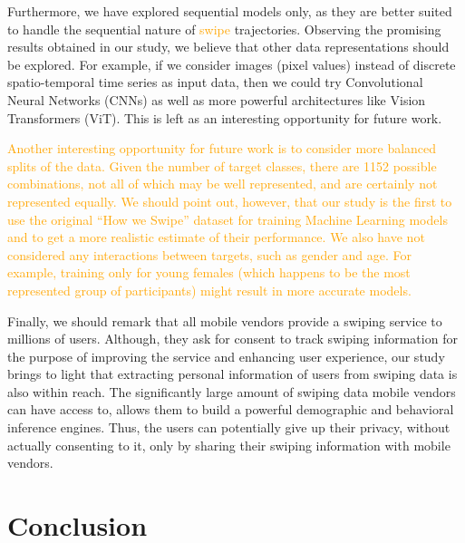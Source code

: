 \documentclass[sn-mathphys, pdflatex]{sn-jnl}
\newcommand{\rev}[1]{\textcolor{orange}{#1}}
\begin{document}
Furthermore, we have explored sequential models only,
as they are better suited to handle the sequential nature of \rev{swipe} trajectories.
Observing the promising results obtained in our study, we believe that other data representations should be explored.
For example, if we consider images (pixel values) instead of discrete spatio-temporal time series as input data,
then we could try Convolutional Neural Networks (CNNs) as well as more powerful architectures like Vision Transformers (ViT).
This is left as an interesting opportunity for future work.

\rev{
Another interesting opportunity for future work is to consider more balanced splits of the data.
Given the number of target classes, there are 1152 possible combinations,
not all of which may be well represented, and are certainly not represented equally.
We should point out, however, that our study is the first to use the original ``How we Swipe'' dataset
for training Machine Learning models and to get a more realistic estimate of their performance.
We also have not considered any interactions between targets, such as gender and age.
For example, training only for young females (which happens to be the most represented group of participants)
might result in more accurate models.
}

Finally, we should remark that all mobile vendors provide a swiping service to millions of users.
Although, they ask for consent to track swiping information for the purpose of improving the service and enhancing user experience,
our study brings to light that extracting personal information of users from swiping data is also within reach.
The significantly large amount of swiping data mobile vendors can have access to,
allows them to build a powerful demographic and behavioral inference engines.
Thus, the users can potentially give up their privacy, without actually consenting to it,
only by sharing their swiping information with mobile vendors.

\section{Conclusion}
\label{sec:conclusion}
\end{document}
